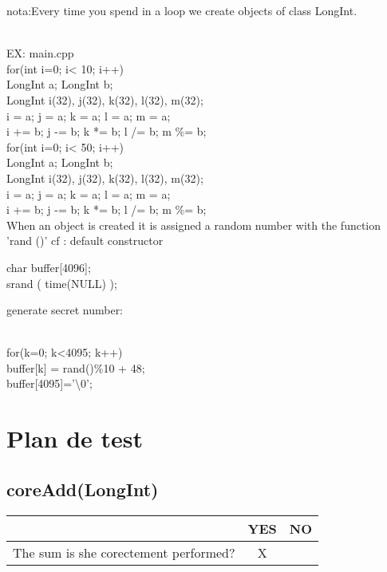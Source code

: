 \documentclass[11pt]{report}
\begin{document}
\begin{bf}nota:Every time you spend in a loop we create objects of class LongInt.\end{bf}\\
EX: main.cpp
\\
 for(int i=0; i< 10; i++) {\\
      LongInt a; LongInt b;\\

      LongInt i(32), j(32), k(32), l(32), m(32);\\

      i = a; j = a; k = a; l = a; m = a; \\

      i += b;  j -= b; k *= b; l /= b; m \%= b; \\
 
    }
 for(int i=0; i< 50; i++) {\\
      LongInt a; LongInt b;\\

      LongInt i(32), j(32), k(32), l(32), m(32);\\

      i = a; j = a; k = a; l = a; m = a; \\

      i += b;  j -= b; k *= b; l /= b; m \%= b; \\
 
    }
When an object is created it is assigned a random number with the function 'rand ()' cf : default constructor

  char buffer[4096];\\
  srand ( time(NULL) );\\
 \begin{bf}generate secret number:\end{bf} \\
  for(k=0; k<4095; k++)\\
	buffer[k] = rand()\%10 + 48;\\
buffer[4095]='\textbackslash0';\\
  
 \chapter*{Plan de test}
    \section{coreAdd(LongInt)}
\begin{tabular}{|l|c|c|}
  \hline
   & YES & NO \\
  \hline
 The sum is she corectement performed? & X &  \\
  \hline
\end{tabular}
\end{document}
